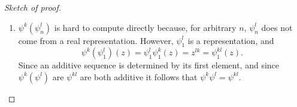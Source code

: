 \documentclass{article}
\newcommand{\C}{\mathbb{C}}
\begin{document}
\begin{proof}[Sketch of proof]
\begin{enumerate}
Now a bundle is determined by its transition functions with respect to some open cover; the point of this construction is that the bundle $E$ having transition functions $g_{\alpha \beta}: V_\alpha \cap V_\beta \to U(n)$ w.r.t.\ $\{V_\alpha\}_{\alpha \in I}$ is replaced by the bundle with transition functions $V_\alpha \cap V_\beta \stackrel{g_{\alpha \beta}}{\to} U(n) \stackrel{\Theta_n}{\to} U(n_1)$ w.r.t.\ the same cover.
From this point of view it is clear that $\hat \varphi (\hat \theta(E)) = P(P(E) \times_{U(n)} \C^{n_1}) \times_{U(n_1)} \C^{n_2}$ is the bundle with transition functions \[V_\alpha \cap V_\beta \stackrel{g_{\alpha \beta}}{\to} U(n) \stackrel{\Theta_n}{\to} U(n_1) \stackrel{\Phi_{n_1}}{\to} U(n_2),\] which is the same as  $P(E) \times_{U(n)} \C^{n_2}$, where $U_n$ acts on $\C^{n_2}$ via the composite $\Phi_{n_1}\circ\Theta_n$. This coincides with $\widehat{\varphi(\theta)} (E)$, as $\varphi(\theta_n):=\Theta_n^*\varphi_{n_1}$, which is the same representation of $U(n)$ on $\C^{n_2}$ as $\Phi_{n_1}\circ\Theta_n$.





%
\item $\psi^k(\psi^l_n)$ is hard to compute directly because, for arbitrary $n$, $\psi^l_n$ does not come from a real representation.  However, $\psi^l_1$ is a representation, and \[\psi^k(\psi^l_1)(z) = \psi^l_1 \psi^k_1(z) = z^{lk} = \psi^{kl}_1(z).\]  Since an additive sequence is determined by its first element, and since $\psi^k(\psi^l)$ are $\psi^{kl}$ are both additive it follows that $\psi^k \psi^l = \psi^{kl}$.\qedhere
\end{enumerate}
\end{proof}
\end{document}
